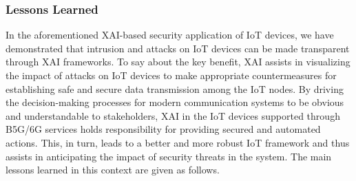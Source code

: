 \documentclass[journal]{IEEEtran}
\begin{document}
\subsubsection{Lessons Learned} 
In the aforementioned XAI-based security application of IoT devices, we have demonstrated that intrusion and attacks on IoT devices can be made transparent through XAI frameworks. To say about the key benefit, XAI assists in visualizing the impact of attacks on IoT devices to make appropriate countermeasures for establishing safe and secure data transmission among the IoT nodes. By driving the decision-making processes for modern communication systems to be obvious and understandable to stakeholders, XAI in the IoT devices supported through B5G/6G services holds responsibility for providing secured and automated actions. This, in turn, leads to a better and more robust IoT framework and thus assists in anticipating the impact of security threats in the system. The main lessons learned in this context are given as follows.
\end{document}
